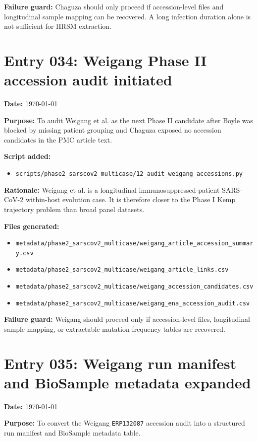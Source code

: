 \textbf{Failure guard:} Chaguza should only proceed if accession-level files and longitudinal sample mapping can be recovered. A long infection duration alone is not sufficient for HRSM extraction.


\section*{Entry 034: Weigang Phase II accession audit initiated}

\textbf{Date:} \today

\textbf{Purpose:} To audit Weigang et al. as the next Phase II candidate after Boyle was blocked by missing patient grouping and Chaguza exposed no accession candidates in the PMC article text.

\textbf{Script added:}
\begin{itemize}
    \item \texttt{scripts/phase2\_sarscov2\_multicase/12\_audit\_weigang\_accessions.py}
\end{itemize}

\textbf{Rationale:} Weigang et al. is a longitudinal immunosuppressed-patient SARS-CoV-2 within-host evolution case. It is therefore closer to the Phase I Kemp trajectory problem than broad panel datasets.

\textbf{Files generated:}
\begin{itemize}
    \item \texttt{metadata/phase2\_sarscov2\_multicase/weigang\_article\_accession\_summary.csv}
    \item \texttt{metadata/phase2\_sarscov2\_multicase/weigang\_article\_links.csv}
    \item \texttt{metadata/phase2\_sarscov2\_multicase/weigang\_accession\_candidates.csv}
    \item \texttt{metadata/phase2\_sarscov2\_multicase/weigang\_ena\_accession\_audit.csv}
\end{itemize}

\textbf{Failure guard:} Weigang should proceed only if accession-level files, longitudinal sample mapping, or extractable mutation-frequency tables are recovered.

\section*{Entry 035: Weigang run manifest and BioSample metadata expanded}

\textbf{Date:} \today

\textbf{Purpose:} To convert the Weigang \texttt{ERP132087} accession audit into a structured run manifest and BioSample metadata table.

